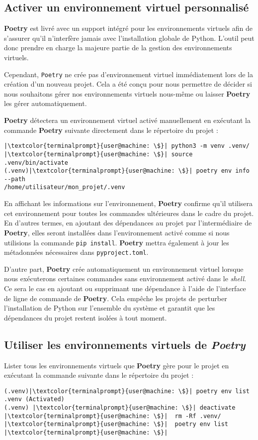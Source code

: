 \subsection*{Activer un environnement virtuel personnalisé}
\textbf{Poetry} est livré avec un support intégré pour les environnements virtuels afin de s'assurer qu'il n'interfère jamais avec l'installation globale de Python. L'outil peut donc prendre en charge la majeure partie de la gestion des environnements virtuels.

Cependant, \texttt{Poetry} ne crée pas d'environnement virtuel immédiatement lors de la création d'un nouveau projet. Cela a été conçu pour nous permettre de décider si nous souhaitons gérer nos environnements virtuels nous-même ou laisser \textbf{Poetry} les gérer automatiquement.

\textbf{Poetry} détectera un environnement virtuel activé manuellement en exécutant la commande \textbf{Poetry} suivante directement dans le répertoire du projet :
\begin{lstlisting}[style=terminal]
|\textcolor{terminalprompt}{user@machine: \$}| python3 -m venv .venv/
|\textcolor{terminalprompt}{user@machine: \$}| source .venv/bin/activate
(.venv)|\textcolor{terminalprompt}{user@machine: \$}| poetry env info --path
/home/utilisateur/mon_projet/.venv
\end{lstlisting}

En affichant les informations sur l'environnement, \textbf{Poetry} confirme qu'il utilisera cet environnement pour toutes les commandes ultérieures dans le cadre du projet. En d'autres termes, en ajoutant des dépendances au projet par l'intermédiaire de \textbf{Poetry}, elles seront installées dans l'environnement activé comme si nous utilisions la commande \texttt{pip install}. \textbf{Poetry} mettra également à jour les métadonnées nécessaires dans \texttt{pyproject.toml}.

D'autre part, \textbf{Poetry} crée automatiquement un environnement virtuel lorsque nous exécuterons certaines commandes sans environnement activé dans le \textit{shell}. Ce sera le cas en ajoutant ou supprimant une dépendance à l'aide de l'interface de ligne de commande de \textbf{Poetry}. Cela empêche les projets de perturber l'installation de Python sur l'ensemble du système et garantit que les dépendances du projet restent isolées à tout moment.

\subsection*{Utiliser les environnements virtuels de \textit{Poetry}}
Lister tous les environnements virtuels que \textbf{Poetry} gère pour le projet en exécutant la commande suivante dans le répertoire du projet :
\begin{lstlisting}[style=terminal]
(.venv)|\textcolor{terminalprompt}{user@machine: \$}| poetry env list
.venv (Activated)
(.venv) |\textcolor{terminalprompt}{user@machine: \$}| deactivate
|\textcolor{terminalprompt}{user@machine: \$}|  rm -Rf .venv/
|\textcolor{terminalprompt}{user@machine: \$}|  poetry env list
|\textcolor{terminalprompt}{user@machine: \$}| 
\end{lstlisting}


